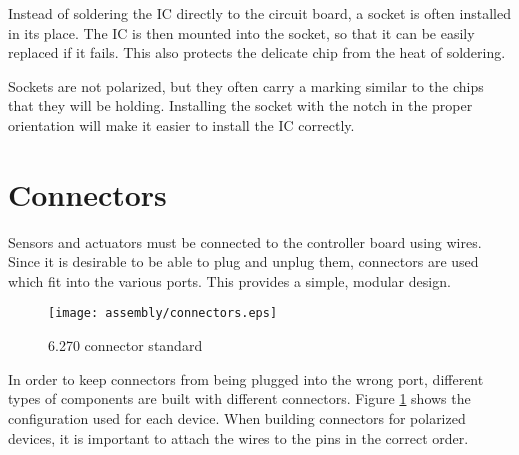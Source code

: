 Instead of soldering the IC directly to the circuit board, a socket is
often installed in its place. The IC is then mounted into the socket,
so that it can be easily replaced if it fails. This also protects the
delicate chip from the heat of soldering.

Sockets are not polarized, but they often carry a marking similar to
the chips that they will be holding. Installing the socket with the
notch in the proper orientation will make it easier to install the IC
correctly.

\section{Connectors}

Sensors and actuators must be connected to the controller board using
wires. Since it is desirable to be able to plug and unplug them,
connectors are used which fit into the various ports. This provides a
simple, modular design.

\begin{figure}[htbp]
\begin{center}
\texttt{[image: assembly/connectors.eps]}
\caption{6.270 connector standard}
\label{connectors}
\end{center}
\end{figure}

In order to keep connectors from being plugged into the wrong port,
different types of components are built with different
connectors. Figure \ref{connectors} shows the configuration used for
each device. When building connectors for polarized devices, it is
important to attach the wires to the pins in the correct order.

